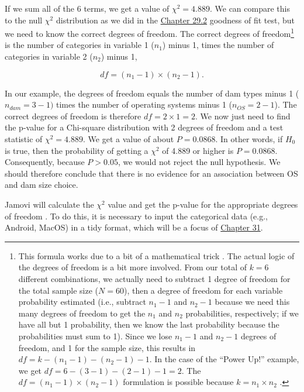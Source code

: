 \documentclass[
]{scrbook}
\begin{document}
If we sum all of the 6 terms, we get a value of \(\chi^{2} = 4.889\).
We can compare this to the null \(\chi^{2}\) distribution as we did in the \protect\hyperlink{chi-squared-goodness-of-fit}{Chapter 29.2} goodness of fit test, but we need to know the correct degrees of freedom.
The correct degrees of freedom\footnote{This formula works due to a bit of a mathematical trick \citep{Sokal1995}. The actual logic of the degrees of freedom is a bit more involved. From our total of \(k = 6\) different combinations, we actually need to subtract 1 degree of freedom for the total sample size (\(N = 60\)), then a degree of freedom for each variable probability estimated (i.e., subtract \(n_{1} - 1\) and \(n_{2} - 1\) because we need this many degrees of freedom to get the \(n_{1}\) and \(n_{2}\) probabilities, respectively; if we have all but 1 probability, then we know the last probability because the probabilities must sum to 1). Since we lose \(n_{1} - 1\) and \(n_{2} - 1\) degrees of freedom, and 1 for the sample size, this results in \(df = k - (n_{1} - 1) - (n_{2} - 1) - 1\). In the case of the ``Power Up!'' example, we get \(df = 6 - (3 - 1) - (2 - 1) - 1 = 2\). The \(df = (n_{1} - 1) \times (n_{2} - 1)\) formulation is possible because \(k = n_{1} \times n_{2}\) \citep{Sokal1995}.} is the number of categories in variable 1 (\(n_{1}\)) minus 1, times the number of categories in variable 2 (\(n_{2}\)) minus 1,

\[df = (n_{1} - 1) \times (n_{2} - 1).\]

In our example, the degrees of freedom equals the number of dam types minus 1 (\(n_{dam} = 3 - 1)\) times the number of operating systems minus 1 (\(n_{OS} = 2 - 1\)).
The correct degrees of freedom is therefore \(df = 2 \times 1 = 2\).
We now just need to find the p-value for a Chi-square distribution with 2 degrees of freedom and a test statistic of \(\chi^{2} = 4.889\).
We get a value of about \(P = 0.0868\).
In other words, if \(H_{0}\) is true, then the probability of getting a \(\chi^{2}\) of 4.889 or higher is \(P = 0.0868\).
Consequently, because \(P > 0.05\), we would not reject the null hypothesis.
We should therefore conclude that there is no evidence for an association between OS and dam size choice.

Jamovi will calculate the \(\chi^{2}\) value and get the p-value for the appropriate degrees of freedom \citep{Jamovi2022}.
To do this, it is necessary to input the categorical data (e.g., Android, MacOS) in a tidy format, which will be a focus of \protect\hyperlink{Chapter_31}{Chapter 31}.
\end{document}
